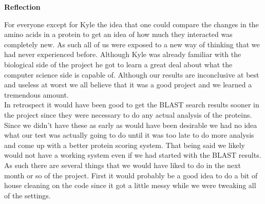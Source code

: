 \documentclass[11pt]{article}
\begin{document}
\newpage

\begin{center}
\textbf{Reflection}
\end{center}


For everyone except for Kyle the idea that one could compare the
changes in the amino acids in a protein to get an idea of how much
they interacted was completely new. As such all of us were exposed to
a new way of thinking that we had never experienced before. Although
Kyle was already familiar with the biological side of the project he
got to learn a great deal about what the computer science side is
capable of. Although our results are inconclusive at best and
useless at worst we all believe that it was a good
project and we learned a tremendous amount. \\

In retrospect it would have been good to get the BLAST search results
sooner in the project since they were necessary to do any actual
analysis of the proteins. Since we didn't have these as early as would
have been desirable we had no idea what our test was actually going to
do until it was too late to do more analysis and come up with a better
protein scoring system. That being said we likely would not have a
working system even if we had started with the BLAST results. \\

As such there are several things that we would have liked to do in the
next month or so of the project. First it would probably be a good
idea to do a bit of house cleaning on the code since it got a little
messy while we were tweaking all of the settings. \\
\end{document}
